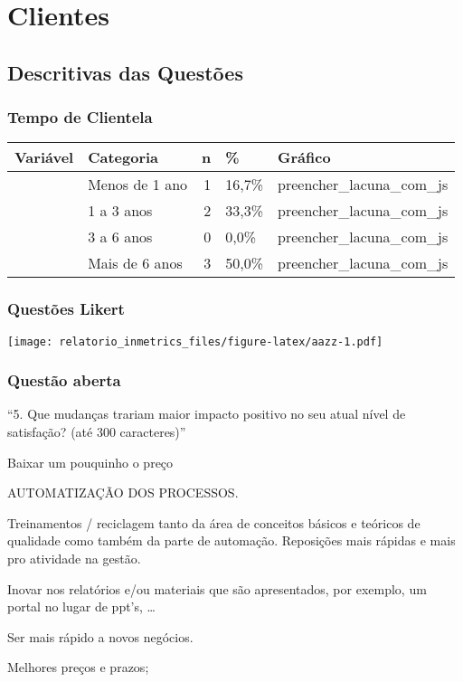 \documentclass[]{book}
\begin{document}
\hypertarget{part-clientes}{%
\part{Clientes}\label{part-clientes}}

\hypertarget{descritivas-das-questoes-1}{%
\chapter{Descritivas das Questões}\label{descritivas-das-questoes-1}}

\hypertarget{tempo-de-clientela}{%
\section{Tempo de Clientela}\label{tempo-de-clientela}}

\begin{longtable}[]{@{}llrll@{}}
\toprule
Variável & Categoria & n & \% & Gráfico\tabularnewline
\midrule
\endhead
& Menos de 1 ano & 1 & 16,7\% & preencher\_lacuna\_com\_js\tabularnewline
& 1 a 3 anos & 2 & 33,3\% & preencher\_lacuna\_com\_js\tabularnewline
& 3 a 6 anos & 0 & 0,0\% & preencher\_lacuna\_com\_js\tabularnewline
& Mais de 6 anos & 3 & 50,0\% & preencher\_lacuna\_com\_js\tabularnewline
\bottomrule
\end{longtable}

\hypertarget{questoes-likert}{%
\section{Questões Likert}\label{questoes-likert}}

\texttt{[image: relatorio\_inmetrics\_files/figure-latex/aazz-1.pdf]}

\hypertarget{questao-aberta}{%
\section{Questão aberta}\label{questao-aberta}}

``5. Que mudanças trariam maior impacto positivo no seu atual nível de satisfação? (até 300 caracteres)''

Baixar
um
pouquinho
o
preço

AUTOMATIZAÇÃO
DOS
PROCESSOS.

Treinamentos /
reciclagem
tanto
da
área
de
conceitos
básicos
e
teóricos
de
qualidade
como
também
da
parte
de
automação.
Reposições
mais
rápidas
e
mais
pro
atividade
na
gestão.

Inovar
nos
relatórios
e/ou
materiais
que
são
apresentados,
por
exemplo,
um
portal
no
lugar
de
ppt's, \ldots{}

Ser
mais
rápido
a
novos
negócios.

Melhores
preços
e
prazos;


\end{document}

